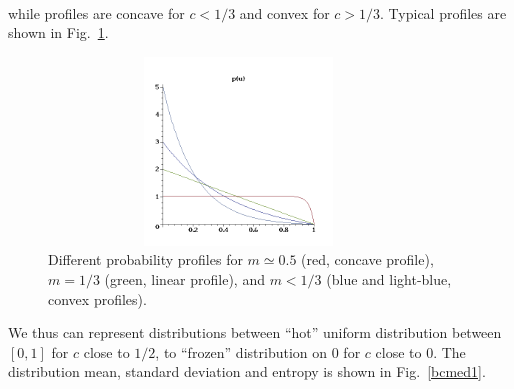 \documentclass{article}
\begin{document}
\\while profiles are concave for $c < 1/3$ and convex for $c > 1/3$.  Typical profiles are shown in Fig.~\ref{bcmed0}.
\begin{figure}[!ht]
\centerline{\includegraphics[width=0.9\textwidth,height=5cm]{img/bcmed0}}
  \caption{Different probability profiles for $m \simeq 0.5$ (red, concave profile), $m = 1/3$ (green, linear profile), and $m < 1/3$ (blue and light-blue, convex profiles).}
  \label{bcmed0}
\end{figure}
We thus can represent distributions between ``hot'' uniform distribution between $[0,1]$ for $c$ close to $1/2$, to ``frozen'' distribution on $0$ for $c$ close to $0$. The distribution mean, standard deviation and entropy is shown in Fig.~\ref{bcmed1}.
\end{document}
